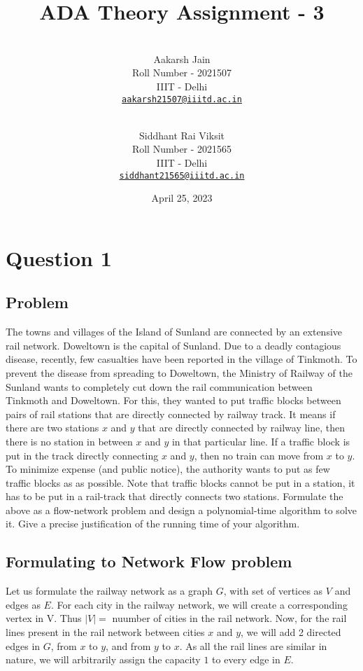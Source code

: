 \documentclass{article}
\title{ADA Theory Assignment - 3}
\author{
    \\\vspace{0em} Aakarsh Jain \\\vspace{-0.5em}
    \footnotesize{Roll Number - 2021507}\\\vspace{-0.5em}
    \footnotesize{IIIT - Delhi}\\\vspace{-0.5em}
    \footnotesize{\href{mailto:aakarsh21507@iiitd.ac.in}{\texttt{aakarsh21507@iiitd.ac.in}}}
  \and
    \\\vspace{0em} Siddhant Rai Viksit \\\vspace{-0.5em}
    \footnotesize{Roll Number - 2021565}\\\vspace{-0.5em}
    \footnotesize{IIIT - Delhi}\\\vspace{-0.5em}
    \footnotesize{\href{mailto:siddhant21565@iiitd.ac.in}{\texttt{siddhant21565@iiitd.ac.in}}} 
    \vspace{1em}
}
\date{April 25, 2023}
\begin{document}
\maketitle

\section{Question 1}

\subsection{Problem}
The towns and villages of the Island of Sunland are connected by an extensive rail
network. Doweltown is the capital of Sunland. Due to a deadly contagious disease, recently, few
casualties have been reported in the village of Tinkmoth. To prevent the disease from spreading
to Doweltown, the Ministry of Railway of the Sunland wants to completely cut down the rail
communication between Tinkmoth and Doweltown. For this, they wanted to put traffic blocks
between pairs of rail stations that are directly connected by railway track. It means if there are two
stations $x$ and $y$ that are directly connected by railway line, then there is no station in between $x$
and $y$ in that particular line. If a traffic block is put in the track directly connecting $x$ and $y$, then
no train can move from $x$ to $y$. To minimize expense (and public notice), the authority wants to
put as few traffic blocks as as possible. Note that traffic blocks cannot be put in a station, it has to
be put in a rail-track that directly connects two stations.
\newline
Formulate the above as a flow-network problem and design a polynomial-time algorithm to solve
it. Give a precise justification of the running time of your algorithm.

\subsection{Formulating to Network Flow problem}

Let us formulate the railway network as a graph $G$, with set of vertices as $V$ and edges as $E$. For each city in the railway network, we will create a corresponding vertex in V. Thus $|V| = $ nuumber of cities in the rail network. Now, for the rail lines present in the rail network between cities $x$ and $y$, we will add 2 directed edges in $G$, from $x$ to $y$, and from $y$ to $x$. As all the rail lines are similar in nature, we will arbitrarily assign the capacity $1$ to every edge in $E$.
\end{document}
